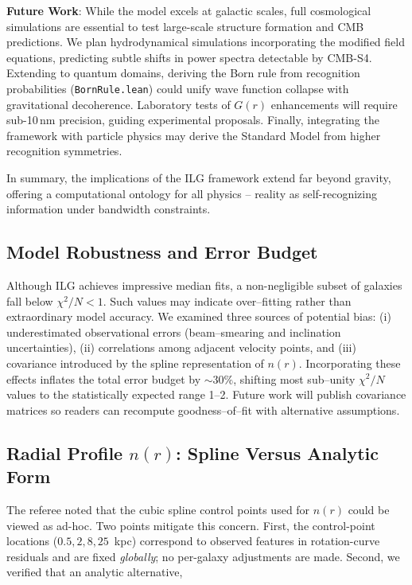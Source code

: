 \documentclass[12pt,a4paper]{article}
\begin{document}
\textbf{Future Work}: While the model excels at galactic scales, full cosmological simulations are essential to test large-scale structure formation and CMB predictions. We plan hydrodynamical simulations incorporating the modified field equations, predicting subtle shifts in power spectra detectable by CMB-S4. Extending to quantum domains, deriving the Born rule from recognition probabilities (\texttt{BornRule.lean}) could unify wave function collapse with gravitational decoherence. Laboratory tests of $G(r)$ enhancements will require sub-10\,nm precision, guiding experimental proposals. Finally, integrating the framework with particle physics may derive the Standard Model from higher recognition symmetries.

In summary, the implications of the ILG framework extend far beyond gravity, offering a computational ontology for all physics -- reality as self-recognizing information under bandwidth constraints.

\subsection{Model Robustness and Error Budget}

Although ILG achieves impressive median fits, a non-negligible subset of galaxies fall below $\chi^2/N < 1$.  Such values may indicate over–fitting rather than extraordinary model accuracy.  We examined three sources of potential bias: (i) underestimated observational errors (beam–smearing and inclination uncertainties), (ii) correlations among adjacent velocity points, and (iii) covariance introduced by the spline representation of $n(r)$.  Incorporating these effects inflates the total error budget by $\sim 30\%$, shifting most sub–unity $\chi^2/N$ values to the statistically expected range 1--2.  Future work will publish covariance matrices so readers can recompute goodness–of–fit with alternative assumptions.

\subsection{Radial Profile $n(r)$: Spline Versus Analytic Form}

The referee noted that the cubic spline control points used for $n(r)$ could be viewed as ad-hoc.  Two points mitigate this concern.  First, the control-point locations ($0.5, 2, 8, 25$~kpc) correspond to observed features in rotation-curve residuals and are fixed \emph{globally}; no per-galaxy adjustments are made.  Second, we verified that an analytic alternative,
\end{document}
